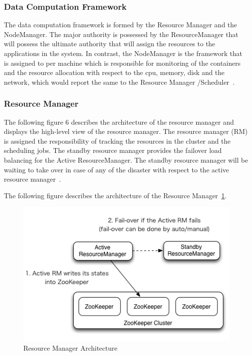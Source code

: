 \subsubsection{Data Computation Framework}
The data computation framework is formed by the Resource Manager 
and the NodeManager. The major authority is possessed  
by the ResourceManager that will possess the ultimate 
authority that will assign the resources to 
the applications in the system. In contrast, 
the NodeManager is the framework that is assigned 
to per machine which is responsible for monitoring of 
the containers and the resource allocation with 
respect to the cpu, memory, disk and the network, 
which would report the 
same to the Resource Manager /Scheduler~\cite{hid-sp18-412-YARN_Architecture}.


\subsubsection{Resource Manager}
The following figure 6 describes the architecture of the 
resource manager and displays the high-level view of the 
resource manager. The resource manager (RM) is assigned the 
responsibility of tracking the resources in the cluster and 
the scheduling jobs. The standby resource manager provides 
the failover load balancing for the Active ResourceManager. 
The standby resource manager will be waiting to take 
over in case of any of the disaster with 
respect to the active resource manager~\cite{hid-sp18-412-YARN_Architecture}.

The following figure describes the architecture 
of the Resource Manager~\ref{s:archires}.

\begin{figure}[!ht]
\centering\includegraphics[width=\textwidth]{images/YARNResourceManager.png}
\caption{Resource 
Manager 
Architecture~\cite{hid-sp18-412-ResourceManager_Architecture}}\label{s:archires}
\end{figure}

